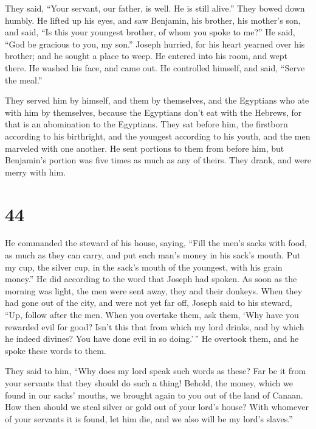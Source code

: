  They said, ``Your servant, our father, is well. He is
still alive.'' They bowed down humbly.  He lifted up his
eyes, and saw Benjamin, his brother, his mother's son, and said, ``Is
this your youngest brother, of whom you spoke to me?'' He said, ``God be
gracious to you, my son.''  Joseph hurried, for his heart
yearned over his brother; and he sought a place to weep. He entered into
his room, and wept there.  He washed his face, and came
out. He controlled himself, and said, ``Serve the meal.''

 They served him by himself, and them by themselves, and
the Egyptians who ate with him by themselves, because the Egyptians
don't eat with the Hebrews, for that is an abomination to the Egyptians.
 They sat before him, the firstborn according to his
birthright, and the youngest according to his youth, and the men
marveled with one another.  He sent portions to them from
before him, but Benjamin's portion was five times as much as any of
theirs. They drank, and were merry with him.

\hypertarget{section-43}{%
\section{44}\label{section-43}}

 He commanded the steward of his house, saying, ``Fill the
men's sacks with food, as much as they can carry, and put each man's
money in his sack's mouth.  Put my cup, the silver cup, in
the sack's mouth of the youngest, with his grain money.'' He did
according to the word that Joseph had spoken.  As soon as
the morning was light, the men were sent away, they and their donkeys.
 When they had gone out of the city, and were not yet far
off, Joseph said to his steward, ``Up, follow after the men. When you
overtake them, ask them, `Why have you rewarded evil for good?
 Isn't this that from which my lord drinks, and by which he
indeed divines? You have done evil in so doing.'\,''  He
overtook them, and he spoke these words to them.

 They said to him, ``Why does my lord speak such words as
these? Far be it from your servants that they should do such a thing!
 Behold, the money, which we found in our sacks' mouths, we
brought again to you out of the land of Canaan. How then should we steal
silver or gold out of your lord's house?  With whomever of
your servants it is found, let him die, and we also will be my lord's
slaves.''


